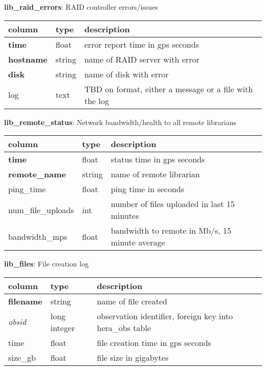\documentclass{article}
\begin{document}
\textbf{\large{lib\_raid\_errors}}: RAID controller errors/issues
\begin{center}
 \begin{tabular}{| p{4cm} | p{2cm} | p{10cm} |} 
\hline
 column & type & description \\ [0.5ex]  \hline\hline
\textbf{time} & float & error report time in gps seconds\\ \hline
\textbf{hostname} & string & name of RAID server with error \\ \hline
\textbf{disk} & string & name of disk with error \\ \hline
log & text & TBD on format, either a message or a file with the log \\\hline
\end{tabular}
\end{center}

\textbf{\large{lib\_remote\_status}}: Network bandwidth/health to all remote librarians
\begin{center}
 \begin{tabular}{| p{4cm} | p{2cm} | p{10cm} |} 
\hline
 column & type & description \\ [0.5ex]  \hline\hline
\textbf{time} & float & status time in gps seconds\\ \hline
\textbf{remote\_name} & string & name of remote librarian \\ \hline
ping\_time & float & ping time in seconds \\\hline
num\_file\_uploads & int & number of files uploaded in last 15 minutes  \\\hline
bandwidth\_mps & float & bandwidth to remote in Mb/s, 15 minute average \\\hline
\end{tabular}
\end{center}

\textbf{\large{lib\_files}}: File creation log
\begin{center}
 \begin{tabular}{| p{4cm} | p{2cm} | p{10cm} |} 
\hline
 column & type & description \\ [0.5ex]  \hline\hline
\textbf{filename} & string & name of file created \\ \hline
\textit{obsid} & long integer & observation identifier, foreign key into hera\_obs table \\ \hline
time & float & file creation time in gps seconds\\ \hline
size\_gb & float & file size in gigabytes \\ \hline
\end{tabular}
\end{center}
\end{document}
